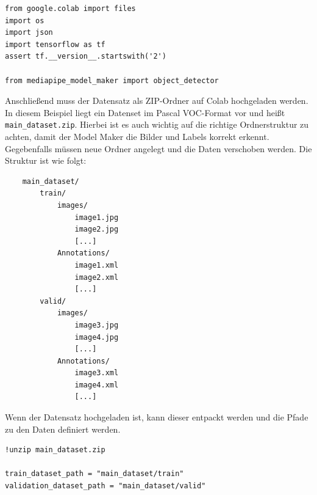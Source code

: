 \begin{lstlisting}
from google.colab import files
import os
import json
import tensorflow as tf
assert tf.__version__.startswith('2')

from mediapipe_model_maker import object_detector
\end{lstlisting}
\noindent
Anschließend muss der Datensatz als ZIP-Ordner auf Colab hochgeladen werden. In diesem Beispiel liegt ein Datenset im Pascal VOC-Format vor und heißt \texttt{main\_dataset.zip}. Hierbei ist es auch wichtig auf die richtige Ordnerstruktur zu achten, damit der Model Maker die Bilder und Labels korrekt erkennt. Gegebenfalls müssen neue Ordner angelegt und die Daten verschoben werden. Die Struktur ist wie folgt:
\begin{lstlisting}
    main_dataset/
        train/
            images/
                image1.jpg
                image2.jpg
                [...]
            Annotations/
                image1.xml
                image2.xml
                [...]
        valid/
            images/
                image3.jpg
                image4.jpg
                [...]
            Annotations/
                image3.xml
                image4.xml
                [...]
\end{lstlisting}
\noindent
Wenn der Datensatz hochgeladen ist, kann dieser entpackt werden und die Pfade zu den Daten definiert werden.
\begin{lstlisting}
!unzip main_dataset.zip

train_dataset_path = "main_dataset/train"
validation_dataset_path = "main_dataset/valid"
\end{lstlisting}


